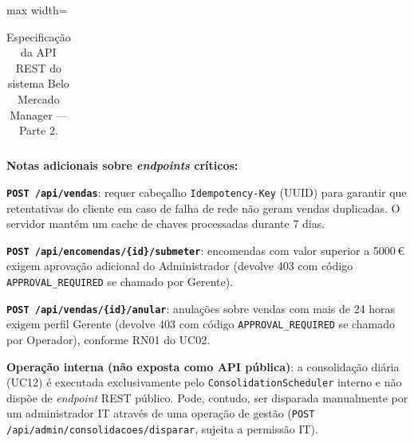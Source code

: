 \begin{table}[H]
\begin{adjustbox}{max width=\textwidth}
\begin{tabular}{|p{1.4cm}|p{5cm}|p{1.2cm}|p{2.3cm}|p{2.2cm}|}
\end{tabular}
\end{adjustbox}
\caption{Especificação da API REST do sistema Belo Mercado Manager — Parte 2.}
\label{tab:api-completa-parte2}
\end{table}

    \textbf{Notas adicionais sobre \textit{endpoints} críticos:}

    \textbf{\texttt{POST /api/vendas}}: requer cabeçalho \texttt{Idempotency-Key} (UUID) para garantir que retentativas do cliente em caso de falha de rede não geram vendas duplicadas. O servidor mantém um cache de chaves processadas durante 7 dias.

\textbf{\texttt{POST /api/encomendas/\{id\}/submeter}}: encomendas com valor superior a 5000\,€ exigem aprovação adicional do Administrador (devolve 403 com código \texttt{APPROVAL\_REQUIRED} se chamado por Gerente).

    \textbf{\texttt{POST /api/vendas/\{id\}/anular}}: anulações sobre vendas com mais de 24 horas exigem perfil Gerente (devolve 403 com código \texttt{APPROVAL\_REQUIRED} se chamado por Operador), conforme RN01 do UC02.

    \textbf{Operação interna (não exposta como API pública)}: a consolidação diária (UC12) é executada exclusivamente pelo \texttt{ConsolidationScheduler} interno e não dispõe de \textit{endpoint} REST público. Pode, contudo, ser disparada manualmente por um administrador IT através de uma operação de gestão (\texttt{POST /api/admin/consolidacoes/disparar}, sujeita a permissão IT).

